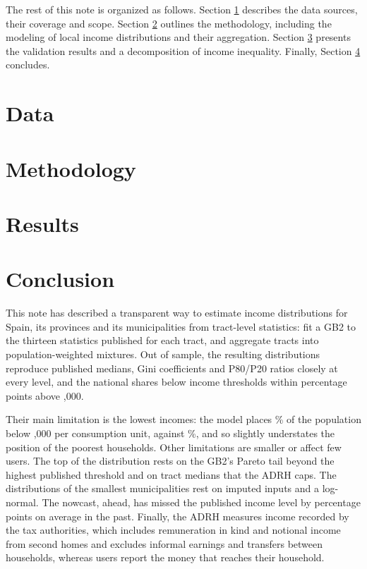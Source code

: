 \documentclass[letterpaper,11pt,leqno]{article}
\begin{document}
The rest of this note is organized as follows. Section \ref{sec:data} describes the data sources, their coverage and scope. Section \ref{sec:method} outlines the methodology, including the modeling of local income distributions and their aggregation. Section \ref{sec:results} presents the validation results and a decomposition of income inequality. Finally, Section \ref{sec:conc} concludes.

\section{Data}\label{sec:data}



\section{Methodology}\label{sec:method}



\section{Results}\label{sec:results}



\section{Conclusion}\label{sec:conc}

This note has described a transparent way to estimate income distributions for Spain, its provinces and its municipalities from tract-level statistics: fit a GB2 to the thirteen statistics published for each tract, and aggregate tracts into population-weighted mixtures. Out of sample, the resulting distributions reproduce published medians, Gini coefficients and P80/P20 ratios closely at every level, and the national shares below income thresholds within \ThrOtherMaxDiff{} percentage points above ,000.

Their main limitation is the lowest incomes: the model places \ThrFiveKModel{}\% of the population below ,000 per consumption unit, against \ThrFiveKObs{}\%, and so slightly understates the position of the poorest households. Other limitations are smaller or affect few users. The top of the distribution rests on the GB2's Pareto tail beyond the highest published threshold and on tract medians that the ADRH caps. The distributions of the smallest municipalities rest on imputed inputs and a log-normal. The nowcast, \NowcastHorizon{} ahead, has missed the published income level by \NowcastBtMAE{} percentage points on average in the past. Finally, the ADRH measures income recorded by the tax authorities, which includes remuneration in kind and notional income from second homes and excludes informal earnings and transfers between households, whereas users report the money that reaches their household.
\end{document}
